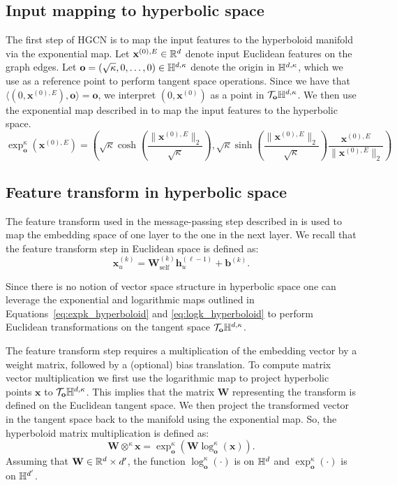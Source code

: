 \subsection{Input mapping to hyperbolic space}
The first step of HGCN is to map the input features to the hyperboloid manifold via the exponential map. Let $\mathbf{x}^{(0), E}\in\mathbb{R}^d$ denote input Euclidean features on the graph edges. Let $\mathbf{o}=(\sqrt{\kappa}, 0, \dots,0)\in \mathbb{H}^{d,\kappa}$ denote the origin in $\mathbb{H}^{d,\kappa}$, which we use as a reference point to perform tangent space operations. Since we have that $\langle({0},\mathbf{x}^{(0), E}), \mathbf{o}\rangle=\mathbf{o}$, we interpret $({0},\mathbf{x}^(0))$ as a point in $\mathcal{T}_\mathbf{o}\mathbb{H}^{d,\kappa}$. We then use the exponential map described in  to map the input features to the hyperbolic space.
\begin{equation}
    \exp_{\mathbf{o}}^\kappa(\mathbf{x}^{(0), E}) = \left(\sqrt{\kappa}\cosh\left(\frac{\|\mathbf{x}^{(0), E}\|_2}{\sqrt{\kappa}}\right), \sqrt{\kappa}\sinh\left(\frac{\|\mathbf{x}^{(0), E}\|_2}{\sqrt{\kappa}}\right)\frac{\mathbf{x}^{(0), E}}{\|\mathbf{x}^{(0), E}\|_2}\right)
\end{equation}

\subsection{Feature transform in hyperbolic space}
The feature transform used in the message-passing step described in  is used to map the embedding space of one layer to the one in the next layer. We recall that the feature transform step in Euclidean space is defined as:
\begin{equation*}
    \mathbf{x}_u^{(k)} = \mathbf{W}_\text{self}^{(k)}\mathbf{h}_u^{(\ell-1)} + \mathbf{b}^{(k)}.
\end{equation*}

Since there is no notion of vector space structure in hyperbolic space one can leverage the exponential and logarithmic maps outlined in Equations~\ref{eq:expk_hyperboloid} and \ref{eq:logk_hyperboloid} to perform Euclidean transformations on the tangent space $\mathcal{T}_\mathbf{o}\mathbb{H}^{d,\kappa}$. 

The feature transform step requires a multiplication of the embedding vector by a weight matrix, followed by a (optional) bias translation. To compute matrix vector multiplication we first use the logarithmic map to project hyperbolic points $\mathbf{x}$ to $\mathcal{T}_\mathbf{o}\mathbb{H}^{d,\kappa}$. This implies that the matrix $\mathbf{W}$ representing the transform is defined on the Euclidean tangent space. We then project the transformed vector in the tangent space back to the manifold using the exponential map. So, the hyperboloid matrix multiplication is defined as:
\begin{equation*}
    \mathbf{W} \otimes^\kappa \mathbf{x} = \exp_{\mathbf{o}}^\kappa\left(\mathbf{W}\log_{\mathbf{o}}^\kappa(\mathbf{x})\right).
\end{equation*}
Assuming that $\mathbf{W} \in \mathbb{R}^{d}\times d'$, the function $\log_{\mathbf{o}}^\kappa(\cdot)$ is on $\mathbb{H}^{d}$ and $\exp_{\mathbf{o}}^\kappa(\cdot)$ is on $\mathbb{H}^{d'}$. 

